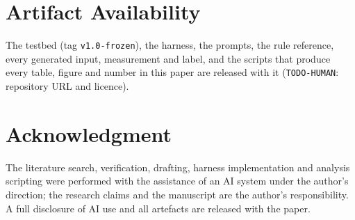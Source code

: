\documentclass[conference]{IEEEtran}
\begin{document}
\section*{Artifact Availability}

The testbed (tag \texttt{v1.0-frozen}), the harness, the prompts, the rule reference, every generated
input, measurement and label, and the scripts that produce every table, figure and number in this paper
are released with it (\texttt{TODO-HUMAN}: repository URL and licence).

\section*{Acknowledgment}

The literature search, verification, drafting, harness implementation and analysis scripting were
performed with the assistance of an AI system under the author's direction; the research claims and
the manuscript are the author's responsibility. A full disclosure of AI use and all artefacts are
released with the paper.



\end{document}

